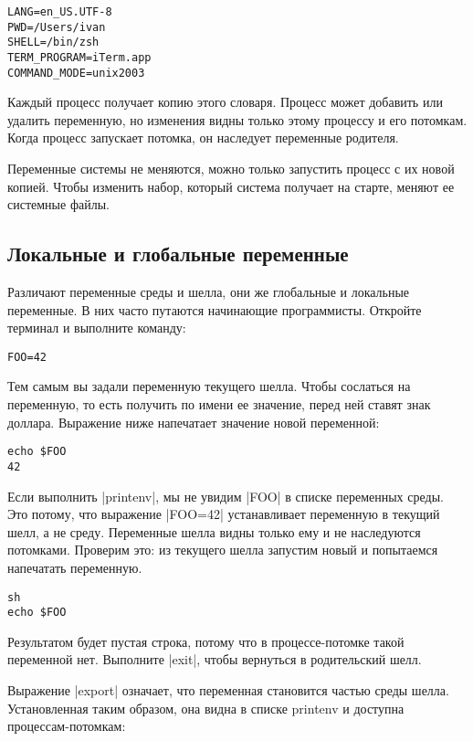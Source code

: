 \begin{verbatim}
LANG=en_US.UTF-8
PWD=/Users/ivan
SHELL=/bin/zsh
TERM_PROGRAM=iTerm.app
COMMAND_MODE=unix2003
\end{verbatim}

Каждый процесс получает копию этого словаря. Процесс может добавить или удалить
переменную, но изменения видны только этому процессу и его потомкам. Когда
процесс запускает потомка, он наследует переменные родителя.

Переменные системы не меняются, можно только запустить процесс с их новой
копией. Чтобы изменить набор, который система получает на старте, меняют ее
системные файлы.


\subsection{Локальные и глобальные переменные}

Различают переменные среды и шелла, они же глобальные и локальные переменные. В
них часто путаются начинающие программисты. Откройте терминал и выполните
команду:

\begin{verbatim}
FOO=42
\end{verbatim}

Тем самым вы задали переменную текущего шелла. Чтобы сослаться на переменную, то
есть получить по имени ее значение, перед ней ставят знак доллара. Выражение
ниже напечатает значение новой переменной:

\begin{verbatim}
echo $FOO
42
\end{verbatim}

Если выполнить \spverb|printenv|, мы не увидим \spverb|FOO| в списке переменных среды. Это
потому, что выражение \spverb|FOO=42| устанавливает переменную в текущий шелл, а не
среду. Переменные шелла видны только ему и не наследуются потомками. Проверим
это: из текущего шелла запустим новый и попытаемся напечатать переменную.

\begin{verbatim}
sh
echo $FOO
\end{verbatim}

Результатом будет пустая строка, потому что в процессе-потомке такой переменной
нет. Выполните \spverb|exit|, чтобы вернуться в родительский шелл.

Выражение \spverb|export| означает, что переменная становится частью среды
шелла. Установленная таким образом, она видна в списке printenv и доступна
процессам-потомкам:

